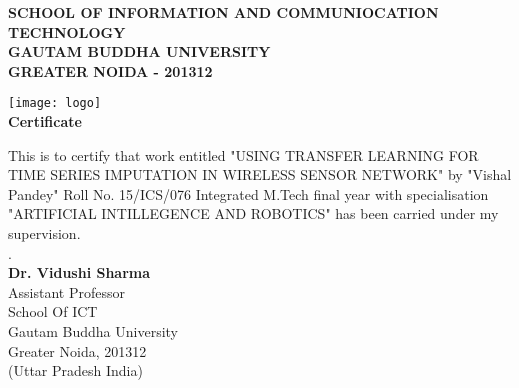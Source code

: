 \thispagestyle{plain}
\begin{center}

	\normalsize
	\textbf{SCHOOL OF INFORMATION AND COMMUNIOCATION TECHNOLOGY}\\
	\textbf{GAUTAM BUDDHA UNIVERSITY}\\
	\textbf{GREATER NOIDA - 201312}

	\vspace{0.5cm}

	\texttt{[image: logo]}\\
	\Large
	\textbf{Certificate}

\end{center}

\normalsize
This is to certify that work entitled "USING TRANSFER LEARNING FOR TIME SERIES IMPUTATION IN WIRELESS SENSOR NETWORK" by "Vishal Pandey" Roll No. 15/ICS/076 Integrated M.Tech final year with specialisation "ARTIFICIAL INTILLEGENCE AND ROBOTICS" has been carried under my supervision.\\

.\\
\textbf{Dr. Vidushi Sharma}\\
Assistant Professor\\
School Of ICT\\
Gautam Buddha University\\
Greater Noida, 201312\\
(Uttar Pradesh India)
